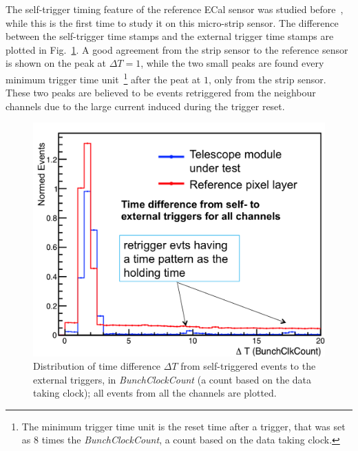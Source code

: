 \documentclass[conference]{IEEEtran}
\begin{document}
The self-trigger timing feature of the reference ECal sensor was studied before~\cite{lycoris1},
while this is the first time to study it on this micro-strip sensor.
The difference between the self-trigger time stamps and the external trigger time stamps are plotted in Fig.~\ref{fig:res1}.
A good agreement from the strip sensor to the reference sensor is shown on the peak at $\Delta T=1$,
while the two small peaks are found every minimum trigger time unit~\footnote{The minimum trigger time unit is the reset time after a trigger, that was set as $8$ times the \textit{BunchClockCount}, a count based on the data taking clock.}
after the peat at $1$, only from the strip sensor.
These two peaks are believed to be events retriggered from the neighbour channels due to the large current induced during the trigger reset.
\begin{figure}[!ht]%
  \centering
  \includegraphics[width=0.8\linewidth]{pics/Res_pic1.png}
  \caption{Distribution of time difference $\Delta T$ from self-triggered events to the external triggers, in \textit{BunchClockCount} (a count based on the data taking clock); all events from all the channels are plotted. }%
\label{fig:res1}%
\end{figure}
\end{document}
